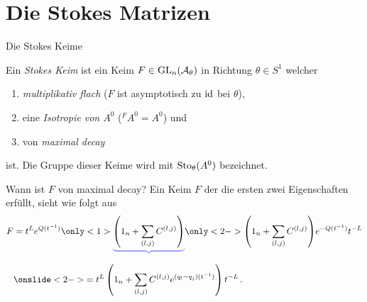\section{Die Stokes Matrizen}
\begin{frame}[t]{Die Stokes Keime}
  \begin{defn}
    Ein \emph{Stokes Keim} ist ein Keim $F\in\operatorname{GL}_n(\mathcal{A}_\theta)$ in Richtung
    $\theta\in S^1$ welcher
    \begin{enumerate}[<+->]
    \item \emph{multiplikativ flach} ($F$ ist asymptotisch zu $\operatorname{id}$ bei $\theta$),
    \item eine \emph{Isotropie von \boldmath$A^0$} (${}^FA^0=A^0$) und
    \item von \emph{maximal decay} 
    \end{enumerate}
    ist. Die Gruppe dieser Keime wird mit $\operatorname{Sto}_\theta(A^0)$ bezeichnet.
  \end{defn}
\end{frame}
\begin{frame}[t]{Wann ist $F$ von maximal decay?}
  Ein Keim $F$ der die ersten zwei
  Eigenschaften erfüllt, sieht wie folgt aus
    \begin{align*}
      F  &=t^L e^{Q(t^{-1})}
           \only<1>{
             \underset{\tikzmarkt{e1}}{
               \textcolor{blue!50!white}{\underbrace{\textcolor{black}{
                     \left(1_n+\sum_{(l,j)}C^{(l,j)}\right)
           }}}}}
           \only<2->{
             \left(1_n+\sum_{(l,j)}C^{(l,j)}\right)
           }
           e^{-Q(t^{-1})}t^{-L}
      \\ &\onslide<2->{=
           t^L\left(
           1_n+\sum_{(l,j)}C^{(l,j)}e^{(q_l-q_j)(t^{-1})}
           \right)t^{-L} \,.}
    \end{align*}
\end{frame}
